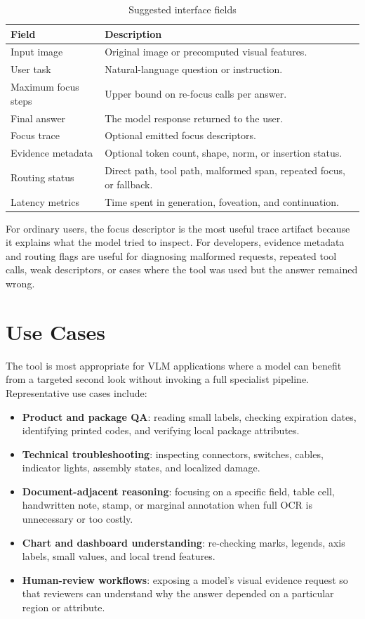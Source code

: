 \documentclass[10pt,twocolumn]{article}
\begin{document}
\begin{table}[t]
\centering
\small
\caption{Suggested interface fields}
\label{tab:interface}
\begin{tabular}{p{}p{}}
\toprule
Field & Description \\
\midrule
Input image & Original image or precomputed visual features. \\
User task & Natural-language question or instruction. \\
Maximum focus steps & Upper bound on re-focus calls per answer. \\
Final answer & The model response returned to the user. \\
Focus trace & Optional emitted focus descriptors. \\
Evidence metadata & Optional token count, shape, norm, or insertion status. \\
Routing status & Direct path, tool path, malformed span, repeated focus, or fallback. \\
Latency metrics & Time spent in generation, foveation, and continuation. \\
\bottomrule
\end{tabular}
\end{table}

For ordinary users, the focus descriptor is the most useful trace artifact because it explains what the model tried to inspect. For developers, evidence metadata and routing flags are useful for diagnosing malformed requests, repeated tool calls, weak descriptors, or cases where the tool was used but the answer remained wrong.

\section{Use Cases}

The tool is most appropriate for VLM applications where a model can benefit from a targeted second look without invoking a full specialist pipeline. Representative use cases include:

\begin{itemize}
  \item \textbf{Product and package QA}: reading small labels, checking expiration dates, identifying printed codes, and verifying local package attributes.
  \item \textbf{Technical troubleshooting}: inspecting connectors, switches, cables, indicator lights, assembly states, and localized damage.
  \item \textbf{Document-adjacent reasoning}: focusing on a specific field, table cell, handwritten note, stamp, or marginal annotation when full OCR is unnecessary or too costly.
  \item \textbf{Chart and dashboard understanding}: re-checking marks, legends, axis labels, small values, and local trend features.
  \item \textbf{Human-review workflows}: exposing a model's visual evidence request so that reviewers can understand why the answer depended on a particular region or attribute.
\end{itemize}
\end{document}
